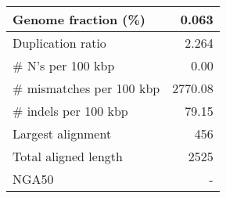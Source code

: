 \documentclass[12pt,a4paper]{article}
\begin{document}
\begin{table}[ht]
\begin{center}
\begin{tabular}{|l*{1}{|r}|}
Genome fraction (\%) & 0.063 \\ \hline
Duplication ratio & 2.264 \\ \hline
\# N's per 100 kbp & 0.00 \\ \hline
\# mismatches per 100 kbp & 2770.08 \\ \hline
\# indels per 100 kbp & 79.15 \\ \hline
Largest alignment & 456 \\ \hline
Total aligned length & 2525 \\ \hline
NGA50 & - \\ \hline
\end{tabular}
\end{center}
\end{table}
\end{document}
